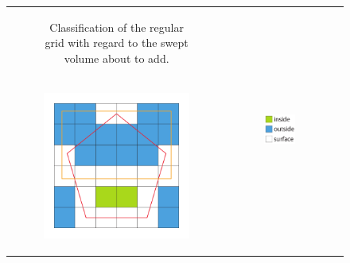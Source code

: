 \begin{figure}[h]
\begin{tabular}{ccc}
\begin{subfigure}[t]{0.3\textwidth}
			\caption{Classification of the regular grid with regard to the swept volume about to add.}
			\label{fig:classification_sv}
		\end{subfigure}&
		\multirow{2}{*}{
			\begin{subfigure}[c]{0.1\textwidth}
				\centering
				\includegraphics[width=\textwidth]{images/classification_legend}
				\label{fig:classification_legend}
			\end{subfigure}
		}\\
		\begin{subfigure}[t]{0.3\textwidth}
			\centering
			\includegraphics[width=\textwidth]{images/classification_after}

\end{subfigure}
\end{tabular}
\end{figure}
